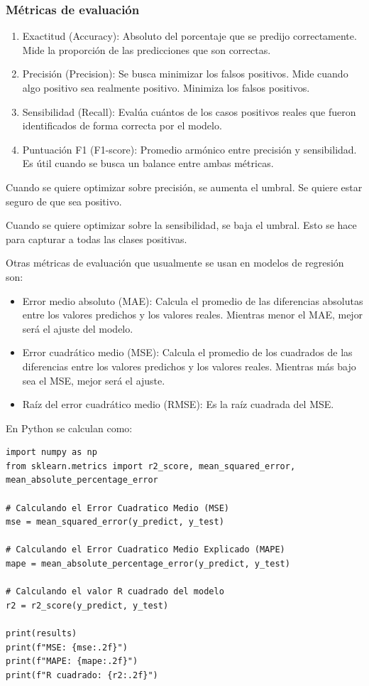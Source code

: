 \documentclass[a4paper, 12pt]{book}
\begin{document}
\subsubsection{Métricas de evaluación}
\begin{enumerate}
	\item Exactitud (Accuracy): Absoluto del porcentaje que se predijo correctamente. Mide la proporción de las predicciones que son correctas.
	\item Precisión (Precision): Se busca minimizar los falsos positivos. Mide cuando algo positivo sea realmente positivo. Minimiza los falsos positivos.
	\item Sensibilidad (Recall): Evalúa cuántos de los casos positivos reales que fueron identificados de forma correcta por el modelo.
	\item Puntuación F1 (F1-score): Promedio armónico entre precisión y sensibilidad. Es útil cuando se busca un balance entre ambas métricas.
\end{enumerate}

Cuando se quiere optimizar sobre precisión, se aumenta el umbral. Se quiere estar seguro de que sea positivo.

Cuando se quiere optimizar sobre la sensibilidad, se baja el umbral. Esto se hace para capturar a todas las clases positivas.


Otras métricas de evaluación que usualmente se usan en modelos de regresión son:
\begin{itemize}
	\item Error medio absoluto (MAE): Calcula el promedio de las diferencias absolutas entre los valores predichos y los valores reales. Mientras menor el MAE, mejor será el ajuste del modelo.
	\item Error cuadrático medio (MSE): Calcula el promedio de los cuadrados de las diferencias entre los valores predichos y los valores reales. Mientras más bajo sea el MSE, mejor será el ajuste.
	\item Raíz del error cuadrático medio (RMSE): Es la raíz cuadrada del MSE.
\end{itemize}
En Python se calculan como:

\begin{verbatim}
import numpy as np
from sklearn.metrics import r2_score, mean_squared_error, mean_absolute_percentage_error

# Calculando el Error Cuadratico Medio (MSE)
mse = mean_squared_error(y_predict, y_test)

# Calculando el Error Cuadratico Medio Explicado (MAPE)
mape = mean_absolute_percentage_error(y_predict, y_test)

# Calculando el valor R cuadrado del modelo
r2 = r2_score(y_predict, y_test)

print(results)
print(f"MSE: {mse:.2f}")
print(f"MAPE: {mape:.2f}")
print(f"R cuadrado: {r2:.2f}")
\end{verbatim}
\end{document}
